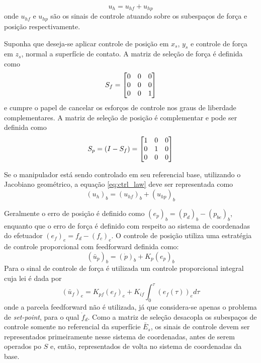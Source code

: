 \begin{equation} \label{eq:ctrl_law}
{u}_h = {u}_{hf} + {u}_{hp}
\end{equation}
onde $u_{hf}$ e $u_{hp}$ são os sinais de controle atuando sobre os subespaços de força e posição respectivamente. 

Suponha que deseja-se aplicar controle de posição em $x_s$, $y_s$ e controle de força em $z_s$, normal a superfície de contato. A matriz de seleção de força é definida como
\begin{equation}
S_f = \begin{bmatrix}
    0 & 0 & 0 \\
    0 & 0 & 0 \\
    0 & 0 & 1 
\end{bmatrix}
\end{equation}
e cumpre o papel de cancelar os esforços de controle nos graus de liberdade complementares. A matriz de seleção de posição é complementar e pode ser definida como
\begin{equation}
S_p = (I - S_f) = \begin{bmatrix}
    1 & 0 & 0 \\
    0 & 1 & 0 \\
    0 & 0 & 0 
\end{bmatrix}
\end{equation}

Se o manipulador está sendo controlado em seu referencial base, utilizando o Jacobiano geométrico, a equação \eqref{eq:ctrl_law} deve ser representada como 
\begin{equation}
({u}_h)_b = ({u}_{hf})_b + ({u}_{hp})_b
\end{equation}

Geralmente o erro de posição é definido como $(e_p)_b = (p_d)_b - (p_{be})_b$, enquanto que o erro de força é definido com respeito ao sistema de coordenadas do efetuador  $(e_f)_e = f_d - (f_{c})_e$. O controle de posição utiliza uma estratégia de controle proporcional com feedforward definida como:
\begin{equation}
(\bar{u}_p)_b = (\dot{p})_b + K_{p} (e_p)_b
\end{equation}
Para o sinal de controle de força é utilizada um controle proporcional integral cuja lei é dada por 
\begin{equation}
(\bar{u}_f)_e = K_{pf} (e_f)_e + K_{if} \int^{\tau}_0 (e_f(\tau))_e d\tau
\end{equation}
onde a parcela feedforward não é utilizada, já que considera-se apenas o problema de \textit{set-point}, para o qual $\dot{f}_d$. Como a matriz de seleção desacopla os subespaços de controle somente no referencial da superfície $\bar{E}_s$, os sinais de controle devem ser representados primeiramente nesse sistema de coordenadas, antes de serem operados po $S$ e, então, representados de volta no sistema de coordenadas da base.

